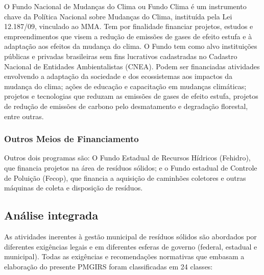 	O Fundo Nacional de Mudanças do Clima ou Fundo Clima é um instrumento chave da Política Nacional sobre Mudanças do Clima, instituída pela  Lei 12.187/09, vinculado ao MMA. Tem por finalidade financiar projetos, estudos e empreendimentos que visem a redução de emissões de gases de efeito estufa e à adaptação aos efeitos da mudança do clima. 
	O Fundo tem como alvo instituições públicas e privadas brasileiras sem fins lucrativos cadastradas no Cadastro Nacional de Entidades Ambientalistas (CNEA). Podem ser financiadas atividades envolvendo a adaptação da sociedade e dos ecossistemas aos impactos da mudança do clima; ações de educação e capacitação em mudanças climáticas; projetos e tecnologias que reduzam as emissões de gases de efeito estufa, projetos de redução de emissões de carbono pelo desmatamento e degradação florestal, entre outras.
	
	
	\subsubsection{Outros Meios de Financiamento}
	
	Outros dois programas são: O Fundo Estadual de Recursos Hídricos (Fehidro), que financia projetos na área de resíduos sólidos; e o Fundo estadual de Controle de Poluição (Fecop), que financia a aquisição de caminhões coletores e outras máquinas de coleta e disposição de resíduos.
	
	\subsection{Análise integrada}
	
	As atividades inerentes à gestão municipal de resíduos sólidos são abordados por diferentes exigências legais e em diferentes esferas de governo (federal, estadual e municipal). Todas as exigências e recomendações normativas que embasam a elaboração do presente PMGIRS foram classificadas em 24 classes:
	
